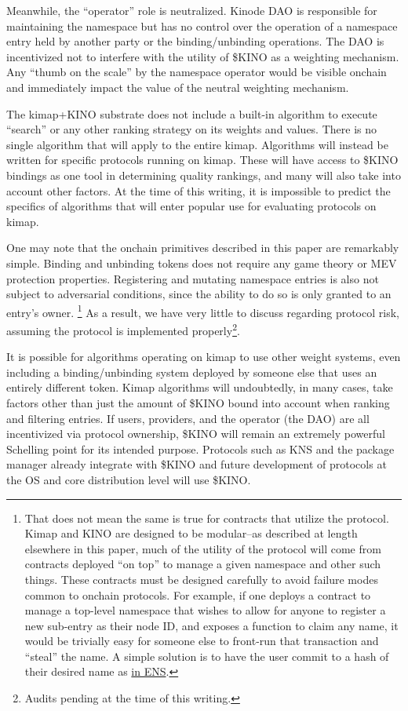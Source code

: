 \documentclass[runningheads]{llncs}
\begin{document}
Meanwhile, the ``operator'' role is neutralized.
Kinode DAO is responsible for maintaining the namespace but has no control over the operation of a namespace entry held by another party or the binding/unbinding operations.
The DAO is incentivized not to interfere with the utility of \$KINO as a weighting mechanism.
Any ``thumb on the scale'' by the namespace operator would be visible onchain and immediately impact the value of the neutral weighting mechanism.

The kimap+KINO substrate does not include a built-in algorithm to execute ``search'' or any other ranking strategy on its weights and values.
There is no single algorithm that will apply to the entire kimap.
Algorithms will instead be written for specific protocols running on kimap.
These will have access to \$KINO bindings as one tool in determining quality rankings, and many will also take into account other factors.
At the time of this writing, it is impossible to predict the specifics of algorithms that will enter popular use for evaluating protocols on kimap.

One may note that the onchain primitives described in this paper are remarkably simple.
Binding and unbinding tokens does not require any game theory or MEV protection properties.
Registering and mutating namespace entries is also not subject to adversarial conditions, since the ability to do so is only granted to an entry's owner.
\footnote{That does not mean the same is true for contracts that utilize the protocol.
Kimap and KINO are designed to be modular–as described at length elsewhere in this paper, much of the utility of the protocol will come from contracts deployed ``on top'' to manage a given namespace and other such things.
These contracts must be designed carefully to avoid failure modes common to onchain protocols.
For example, if one deploys a contract to manage a top-level namespace that wishes to allow for anyone to register a new sub-entry as their node ID, and exposes a function to claim any name, it would be trivially easy for someone else to front-run that transaction and ``steal'' the name.
A simple solution is to have the user commit to a hash of their desired name as \href{https://docs.ens.domains/registry/eth\#commit-reveal}{in ENS}.}
As a result, we have very little to discuss regarding protocol risk, assuming the protocol is implemented properly\footnote{Audits pending at the time of this writing.}.

It is possible for algorithms operating on kimap to use other weight systems, even including a binding/unbinding system deployed by someone else that uses an entirely different token.
Kimap algorithms will undoubtedly, in many cases, take factors other than just the amount of \$KINO bound into account when ranking and filtering entries.
If users, providers, and the operator (the DAO) are all incentivized via protocol ownership, \$KINO will remain an extremely powerful Schelling point for its intended purpose.
Protocols such as KNS and the package manager already integrate with \$KINO and future development of protocols at the OS and core distribution level will use \$KINO.
\end{document}
